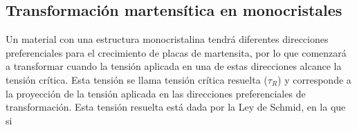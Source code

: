 \documentclass[a4paper,12pt,fleqn,twoside,openany]{book}
\begin{document}
 \subsection{Transformación martensítica en monocristales}

Un material con una estructura monocristalina tendrá diferentes direcciones preferenciales para el crecimiento de placas de martensita, por lo que comenzará a transformar cuando la tensión aplicada en una de estas direcciones alcance la tensión crítica. Esta tensión se llama tensión crítica resuelta ($\tau_{R}$) y corresponde a la proyección de la tensión aplicada en las direcciones preferenciales de transformación. Esta tensión resuelta está dada por la Ley de Schmid, en la que si
%
\end{document}
